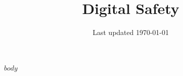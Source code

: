 \documentclass{article}
\title{Digital Safety}
\author{}
\date{Last updated \today}
\begin{document}
\maketitle


$body$
\end{document}
